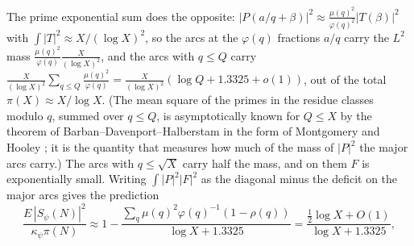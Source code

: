 \documentclass[11pt]{amsart}
\theoremstyle{remark}
\begin{document}
The prime exponential sum does the opposite: $|P(a/q+\beta)|^2\approx\frac{\mu(q)^2}{\varphi(q)^2}|T(\beta)|^2$ with $\int|T|^2\approx X/(\log X)^2$, so the arcs at the $\varphi(q)$ fractions $a/q$ carry the $L^2$ mass $\frac{\mu(q)^2}{\varphi(q)}\frac X{(\log X)^2}$, and the arcs with $q\le Q$ carry $\frac{X}{(\log X)^2}\sum_{q\le Q}\frac{\mu(q)^2}{\varphi(q)}=\frac X{(\log X)^2}(\log Q+1.3325+o(1))$, out of the total $\pi(X)\approx X/\log X$. (The mean square of the primes in the residue classes modulo $q$, summed over $q\le Q$, is asymptotically known for $Q\le X$ by the theorem of Barban--Davenport--Halberstam in the form of Montgomery \cite{Montgomery} and Hooley \cite{Hooley}; it is the quantity that measures how much of the mass of $|P|^2$ the major arcs carry.) The arcs with $q\le\sqrt X$ carry half the mass, and on them $F$ is exponentially small. Writing $\int|P|^2|F|^2$ as the diagonal minus the deficit on the major arcs gives the prediction
\[
\frac{E\,|S_\psi(N)|^2}{\kappa_\psi\pi(N)}\approx1-\frac{\sum_q\mu(q)^2\varphi(q)^{-1}(1-\rho(q))}{\log X+1.3325}=\frac{\frac12\log X+O(1)}{\log X+1.3325},
\]
\end{document}
